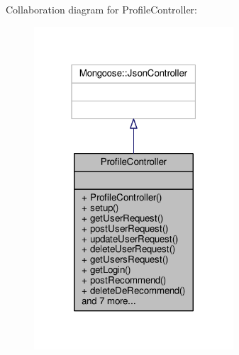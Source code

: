 Collaboration diagram for Profile\+Controller\+:\nopagebreak
\begin{figure}[H]
\begin{center}
\leavevmode
\includegraphics[width=211pt]{d5/dff/classProfileController__coll__graph}
\end{center}
\end{figure}
